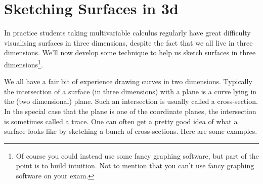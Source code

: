 \section{Sketching Surfaces in 3d}\label{sec sketching}

In practice students taking multivariable calculus regularly have great
difficulty visualising surfaces in three dimensions, despite the fact
that we all live in three dimensions. We'll now develop some
technique to help us sketch surfaces in three dimensions\footnote{Of course you could instead use some fancy graphing software, but part of the point is to
build intuition. Not to mention that you can't use fancy graphing software on 
your exam.}.

We all have a fair
bit of experience drawing curves in two dimensions. Typically the intersection
of a surface (in three dimensions) with a plane is a curve lying in 
the (two dimensional) plane. Such an intersection is usually called a cross-section.
In the special case that the plane is one of the coordinate planes, the
intersection is sometimes called a trace. One can often get a pretty good
idea of what a surface looks like by sketching a bunch of cross-sections.
Here are some examples.

